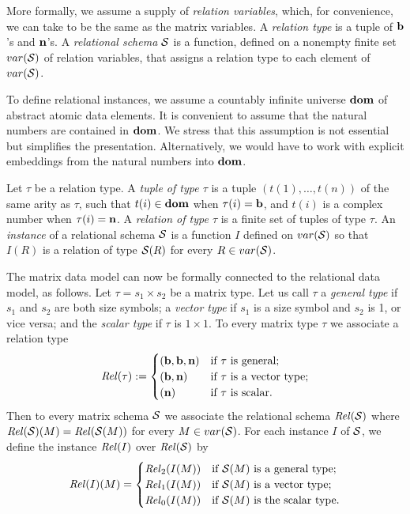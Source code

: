 More formally,
we assume a supply of \emph{relation variables}, which, for
convenience, we can take to be the same as the matrix variables.
A \emph{relation type} is a tuple of $\mathbf{b}$'s and $\mathbf{n}$'s.
A \emph{relational schema} $\mathcal{S}$ is a function, defined on a
nonempty finite set
$var(\mathcal{S})$ of relation variables, that assigns a relation type
to each element of $var(\mathcal{S})$.

To define relational instances, we assume a countably infinite universe
$\mathbf{dom}$ of abstract atomic data elements.  It is convenient to
assume that the natural numbers are contained in $\mathbf{dom}$.  We
stress that this assumption is not essential but simplifies the
presentation.  Alternatively, we would have to work with explicit
embeddings from the natural numbers into $\mathbf{dom}$.

Let $\tau$ be a relation type. A \emph{tuple
of type $\tau$} is a tuple $(t(1),\dots,t(n))$ of the same arity
as $\tau$, such that $t(i) \in \mathbf{dom}$ when $\tau(i) = \mathbf{b}$, and
$t(i)$ is a complex number when $\tau(i) = \mathbf{n}$.
A \emph{relation of type
$\tau$} is a finite set of tuples of type $\tau$.  
An \emph{instance} of a relational schema $\mathcal{S}$ is a
function $I$ defined on $var(\mathcal{S})$ so that $I(R)$ is a relation
of type $\mathcal{S}(R)$ for every $R \in var(\mathcal{S})$.

The matrix data model can now be formally connected to the relational data
model, as follows. Let $\tau = s_1\times s_2$ be a matrix type.  Let us call $\tau$ a
\emph{general type} if $s_1$ and $s_2$ are both size symbols; a
\emph{vector type} if $s_1$ is a size symbol and $s_2$ is 1, or
vice versa; and the \emph{scalar type} if $\tau$ is $1\times 1$.
To every matrix type $\tau$ we associate a relation type
$$ \mathit{Rel}(\tau) := \begin{cases}
(\mathbf{b},\mathbf{b},\mathbf{n}) & \text{if $\tau$ is general;} \\
(\mathbf{b},\mathbf{n}) & \text{if $\tau$ is a vector type;} \\
(\mathbf{n}) & \text{if $\tau$ is scalar.} \end{cases} $$
Then to every matrix schema $\mathcal{S}$ we associate the relational
schema $\mathit{Rel}(\mathcal{S})$ where $\mathit{Rel}(\mathcal{S})(M) = \mathit{Rel}(\mathcal{S}(M))$ for
every $M \in var(\mathcal{S})$.  For each instance $I$ of
$\mathcal{S}$, we define the instance $\mathit{Rel}(I)$ over
$\mathit{Rel}(\mathcal{S})$ by $$ \mathit{Rel}(I)(M) = \begin{cases} 
\mathit{Rel}_2(I(M)) & \text{if $\mathcal{S}(M)$ is a general type;} \\
\mathit{Rel}_1(I(M)) & \text{if $\mathcal{S}(M)$ is a vector type;} \\
\mathit{Rel}_0(I(M)) & \text{if $\mathcal{S}(M)$ is the scalar type.}
\end{cases} $$  

